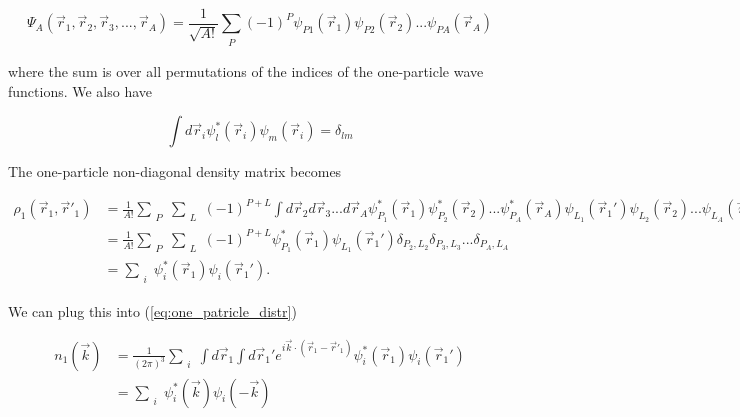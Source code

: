 \documentclass[12pt]{article}
\begin{document}
\begin{equation}
\Psi_A(\vec{r}_1,\vec{r}_2,\vec{r}_3, ... ,\vec{r}_A)= \frac{1}{\sqrt{A!}} \sum_{\substack{P}} 
													  (-1)^P \psi_{P1}(\vec{r}_1)
													         \psi_{P2}(\vec{r}_2)...
													         \psi_{PA}(\vec{r}_A)
\end{equation}

where the sum is over all permutations of the indices of the one-particle wave functions. We also have 

\begin{equation}
\int d\vec{r}_i \psi^*_l(\vec{r}_i)\psi_m(\vec{r}_i) = \delta_{lm}
\end{equation}

The one-particle non-diagonal density matrix becomes

\begin{align}
\rho_1(\vec{r}_1,\vec{r}'_1) & = \frac{1}{A!} 	 \sum_{\substack{P}} \sum_{\substack{L}} (-1)^{P+L} \int d\vec{r}_2 d\vec{r}_3 ... d\vec{r}_A 
\psi^*_{P_1}(\vec{r}_1)\psi^*_{P_2}(\vec{r}_2)...\psi^*_{P_A}(\vec{r}_A)
\psi_{L_1}(\vec{r}_1')\psi_{L_2}(\vec{r}_2)...\psi_{L_A}(\vec{r}_A) \\
&  = \frac{1}{A!} 	 \sum_{\substack{P}} \sum_{\substack{L}} (-1)^{P+L} \psi^*_{P_1}(\vec{r}_1) \psi_{L_1}(\vec{r}_1') 
\delta_{P_2,L_2}\delta_{P_3,L_3}...\delta_{P_A,L_A} \\
& = \sum_{\substack{i}} \psi^*_i(\vec{r}_1) \psi_i(\vec{r}_1').
\end{align}

We can plug this into (\ref{eq:one_patricle_distr})

\begin{align} 
	n_1(\vec{k})&=\frac{1}{(2\pi)^3} \sum_{\substack{i}} \int d\vec{r}_1 \int d\vec{r}_1' e^{i\vec{k}\cdot (\vec{r}_1-\vec{r}'_1)}
	\psi^*_i(\vec{r}_1)\psi_i(\vec{r}_1') \\
	& = \sum_{\substack{i}} \psi^*_i(\vec{k})\psi_i(-\vec{k})
\end{align}
	
\end{document}
